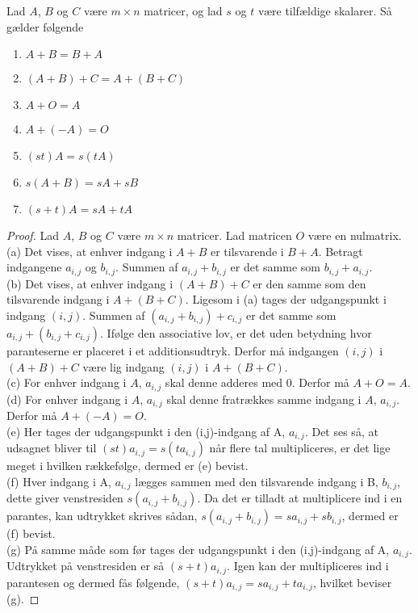 \begin{stn}
Lad $A$, $B$ og $C$ være $m \times n$ matricer, og lad $s$ og $t$ være tilfældige skalarer. 
Så gælder følgende
\begin{enumerate}[label=(\alph*)]
\item $A + B = B + A$
\item $(A + B) + C = A + (B + C)$
\item $A + O = A$
\item $A + (-A) = O$
\item $(st) A = s (tA)$
\item $s(A + B) = sA + sB$
\item $(s+t)A = sA + tA$
\end{enumerate}
\label{stn_regn}
\end{stn}

\begin{proof} 
Lad $A$, $B$ og $C$ være $m \times n$ matricer. Lad matricen $O$ være en nulmatrix. \\
(a) Det vises, at enhver indgang i $A + B$ er tilsvarende i $B + A$. Betragt indgangene $a_{i,j}$ og $b_{i,j}$. Summen af $a_{i,j} + b_{i,j}$ er det samme som $b_{i,j} + a_{i,j}$. \\
(b) Det vises, at enhver indgang i $(A + B) + C$ er den samme som den tilsvarende indgang i $A + (B + C)$. Ligesom i (a) tages der udgangspunkt i indgang $(i,j)$. Summen af $(a_{i,j} + b_{i,j}) + c_{i,j}$ er det samme som $a_{i,j} + (b_{i,j} + c_{i,j})$. Ifølge den associative lov, er det uden betydning hvor paranteserne er placeret i et additionsudtryk. Derfor må indgangen $(i,j)$ i $(A + B) + C$ være lig indgang $(i,j)$ i $A + (B + C)$. \\
(c) For enhver indgang i $A$, $a_{i,j}$ skal denne adderes med $0$. Derfor må $A + O = A$. \\
(d) For enhver indgang i $A$, $a_{i,j}$ skal denne fratrækkes samme indgang i $A$, $a_{i,j}$. Derfor må $A + (-A) = O$. \\
(e) Her tages der udgangspunkt i den (i,j)-indgang af A, $a_{i,j}$. Det ses så, at udsagnet bliver til $(st)a_{i,j} = s(ta_{i,j})$ når flere tal multipliceres, er det lige meget i hvilken rækkefølge, dermed er (e) bevist. \\
(f) Hver indgang i A, $a_{i,j}$ lægges sammen med den tilsvarende indgang i B, $b_{i,j}$, dette giver venstresiden $s(a_{i,j}+b_{i,j})$. Da det er tilladt at multiplicere ind i en parantes, kan udtrykket skrives sådan, $s(a_{i,j}+b_{i,j})=sa_{i,j}+sb_{i,j}$, dermed er (f) bevist. \\
(g) På samme måde som før tages der udgangspunkt i den (i,j)-indgang af A, $a_{i,j}$. Udtrykket på venstresiden er så $(s+t)a_{i,j}$. Igen kan der multipliceres ind i parantesen og dermed fås følgende, $(s+t)a_{i,j}=sa_{i,j}+ta_{i,j}$, hvilket beviser (g).
\end{proof}

